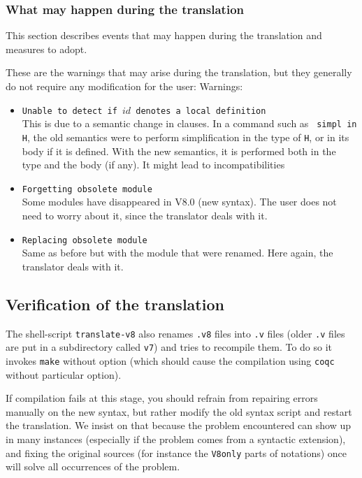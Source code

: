 \documentclass[11pt,a4paper]{article}
\begin{document}
\subsubsection{What may happen during the translation}

This section describes events that may happen during the
translation and measures to adopt.

These are the warnings that may arise during the translation, but they
generally do not require any modification for the user:
Warnings:
\begin{itemize}
\item {\tt Unable to detect if $id$ denotes a local definition}\\
This is due to a semantic change in clauses. In a command such as {\tt
simpl in H}, the old semantics were to perform simplification in the
type of {\tt H}, or in its body if it is defined. With the new
semantics, it is performed both in the type and the body (if any). It
might lead to incompatibilities

\item {\tt Forgetting obsolete module}\\
Some modules have disappeared in V8.0 (new syntax). The user does not
need to worry about it, since the translator deals with it.

\item {\tt Replacing obsolete module}\\
Same as before but with the module that were renamed. Here again, the
translator deals with it.
\end{itemize}

\subsection{Verification of the translation}

The shell-script {\tt translate-v8} also renames {\tt .v8} files into
{\tt .v} files (older {\tt .v} files are put in a subdirectory called
{\tt v7}) and tries to recompile them. To do so it invokes {\tt make}
without option (which should cause the compilation using {\tt coqc}
without particular option).

If compilation fails at this stage, you should refrain from repairing
errors manually on the new syntax, but rather modify the old syntax
script and restart the translation. We insist on that because the
problem encountered can show up in many instances (especially if the
problem comes from a syntactic extension), and fixing the original
sources (for instance the {\tt V8only} parts of notations) once will
solve all occurrences of the problem.
\end{document}
